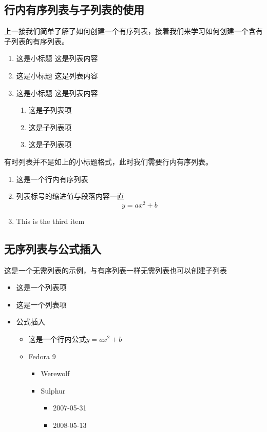 \documentclass{bjfu}
\begin{document}
\subsection{行内有序列表与子列表的使用}
上一接我们简单了解了如何创建一个有序列表，接着我们来学习如何创建一个含有子列表的有序列表。
\begin{enumerate}[labelsep = .5em, leftmargin = 0pt, itemindent = 3em]
    \item 这是小标题 %
    \setlength{\parindent}{2em}这是列表内容

    \item 这是小标题 %
    \setlength{\parindent}{2em}这是列表内容

    \item 这是小标题 %
    \setlength{\parindent}{2em}这是列表内容
    \begin{enumerate}[itemindent=2em]
        \item 这是子列表项 
        \item 这是子列表项 
        \item 这是子列表项 
    \end{enumerate}
\end{enumerate}
有时列表并不是如上的小标题格式，此时我们需要行内有序列表。
\begin{enumerate}[fullwidth,itemindent=2em]
    \item 这是一个行内有序列表
    \item 列表标号的缩进值与段落内容一直
    \begin{equation}
        y=ax^2+b
    \end{equation}
    \item This is the third item 
\end{enumerate}


\subsection{无序列表与公式插入}
这是一个无需列表的示例，与有序列表一样无需列表也可以创建子列表
\begin{itemize}
    \item 这是一个列表项
    \item 这是一个列表项
    \item 公式插入
    \begin{itemize}
        \item 这是一个行内公式$y=ax^2+b$
        \item Fedora 9
        \begin{itemize}
            \item Werewolf
            \item Sulphur
            \begin{itemize}
                \item 2007-05-31
                \item 2008-05-13
            \end{itemize}
        \end{itemize}
    \end{itemize}
    
\end{itemize}
\end{document}
